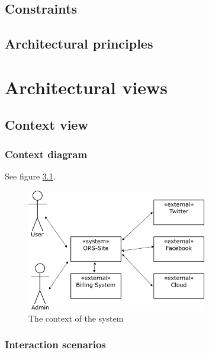 \documentclass[a4paper,11pt]{report}
\begin{document}
\section{Constraints}
\label{sec:constraints}

\section{Architectural principles}
\label{sec:arch-princ}


\chapter{Architectural views}
\label{cha:architectural-views}
\thispagestyle{fancy}

\section{Context view}
\label{sec:context-view}



\subsection{Context diagram}
\label{sec:context-diagram}

See figure \ref{fig:context}.

\begin{figure}[h!]
  \centering
  \includegraphics[width=0.7\textwidth]{figures/context_drawing}
  \caption{The context of the system}
  \label{fig:context}
\end{figure}




\subsection{Interaction scenarios}
\label{sec:inter-scen}
\end{document}
